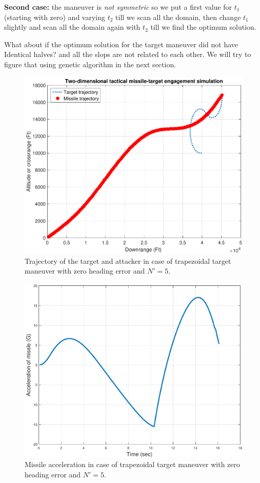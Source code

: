 
\textbf{Second case:} the maneuver is \textit{not symmetric} so we put a first value for $t_1$ (starting with zero) and varying $t_2$ till we scan all the domain, then change $t_1$ slightly and scan all the domain again with $t_2$ till we find the optimum solution.

What about if the optimum solution for the target maneuver did not have Identical halves? and all the slops are not related to each other. We will try to figure that using genetic algorithm in the next section. 


\begin{figure}[htb]
	\centering
	\includegraphics[scale = 0.35]{fig/trajectoryTrap.pdf}
	\caption{Trajectory of the target and attacker in case of trapezoidal target maneuver with zero heading error and $N'=5$.}
	\label{trajectory trap}
\end{figure}


\begin{figure}[htb]
	\centering
	\includegraphics[scale = 0.35]{fig/MissileAccelerationTrap.pdf}
	\caption{Missile acceleration in case of trapezoidal target maneuver with zero heading error and $N'=5$.}
	\label{missile acceleration trap}
\end{figure}

